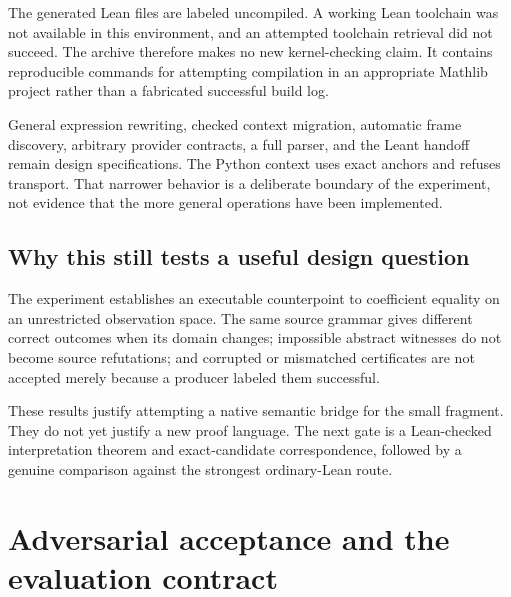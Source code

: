\documentclass[11pt,letterpaper]{article}
\newcommand{\code}[1]{\texttt{\detokenize{#1}}}
\theoremstyle{definition}\newtheorem{definition}[theorem]{Definition}
\theoremstyle{remark}\newtheorem{remark}[theorem]{Remark}
\begin{document}
The generated Lean files are labeled uncompiled. A working Lean toolchain was
not available in this environment, and an attempted toolchain retrieval did
not succeed. The archive therefore makes no new kernel-checking claim. It
contains reproducible commands for attempting compilation in an appropriate
Mathlib project rather than a fabricated successful build log.

General expression rewriting, checked context migration, automatic frame
discovery, arbitrary provider contracts, a full \code{requires} parser, and the
Leant handoff remain design specifications. The Python context uses exact
anchors and refuses transport. That narrower behavior is a deliberate boundary
of the experiment, not evidence that the more general operations have been
implemented.

\subsection{Why this still tests a useful design question}
The experiment establishes an executable counterpoint to coefficient equality
on an unrestricted observation space. The same source grammar gives different
correct outcomes when its domain changes; impossible abstract witnesses do
not become source refutations; and corrupted or mismatched certificates are
not accepted merely because a producer labeled them successful.

These results justify attempting a native semantic bridge for the small
fragment. They do not yet justify a new proof language. The next gate is a
Lean-checked interpretation theorem and exact-candidate correspondence,
followed by a genuine comparison against the strongest ordinary-Lean route.

\section{Adversarial acceptance and the evaluation contract}\label{sec:evaluation}
\end{document}

